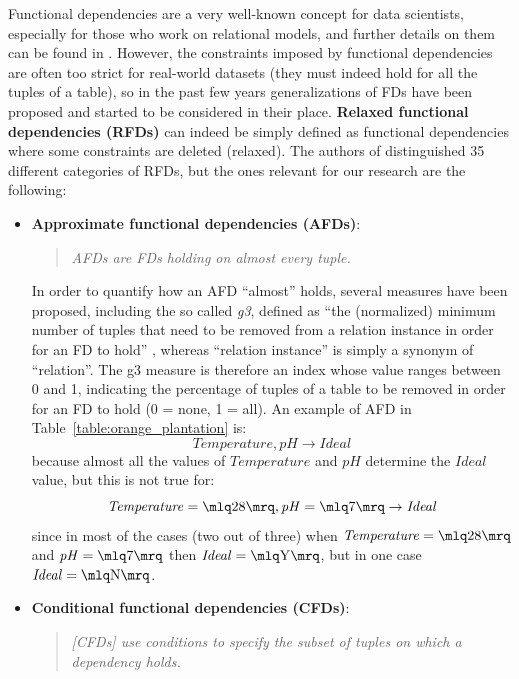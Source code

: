 Functional dependencies are a very well-known concept for data scientists, especially for those who work on relational models, and further details on them can be found in \cite{abiteboul1995foundations}.
However, the constraints imposed by functional dependencies are often too strict for real-world datasets (they must indeed hold for all the tuples of a table), so in the past few years generalizations of FDs have been proposed and started to be considered in their place. \textbf{Relaxed functional dependencies (RFDs)} can indeed be simply defined as functional dependencies where some constraints are deleted (relaxed). The authors of \cite{caruccio2015relaxed} distinguished 35 different categories of RFDs, but the ones relevant for our research are the following:
\begin{itemize}
\item \textbf{Approximate functional dependencies (AFDs)}:
\begin{quote}\emph{AFDs are FDs holding on almost every tuple.} \cite[p.~151]{caruccio2015relaxed}\end{quote}
In order to quantify how an AFD ``almost'' holds, several measures have been proposed, including the so called \textit{g3}, defined as ``the (normalized) minimum number of tuples that need to be removed from a relation instance in order for an FD to hold'' \cite[p.~151]{caruccio2015relaxed}, whereas ``relation instance'' is simply a synonym of ``relation''. The g3 measure is therefore an index whose value ranges between 0 and 1, indicating the percentage of tuples of a table to be removed in order for an FD to hold (0 = none, 1 = all). An example of AFD in Table~\ref{table:orange_plantation} is: \[\mathit{Temperature}, \mathit{pH} \rightarrow \mathit{Ideal}\] because almost all the values of \(\mathit{Temperature}\) and \(\mathit{pH}\) determine the \(\mathit{Ideal}\) value, but this is not true for: \[\mathit{Temperature} = \mlq 28 \mrq, \mathit{pH} = \mlq 7 \mrq \rightarrow \mathit{Ideal}\] since in most of the cases (two out of three) when \(\mathit{Temperature} = \mlq 28 \mrq\) and \(\mathit{pH} = \mlq 7 \mrq\) then \(\mathit{Ideal} = \mlq \mathrm{Y} \mrq\), but in one case \(\mathit{Ideal} = \mlq \mathrm{N} \mrq\).
\item \textbf{Conditional functional dependencies (CFDs)}:
\begin{quote}\emph{[CFDs] use conditions to specify the subset of tuples on which a dependency holds.} \cite[p.~152]{caruccio2015relaxed}\end{quote}

\end{itemize}
